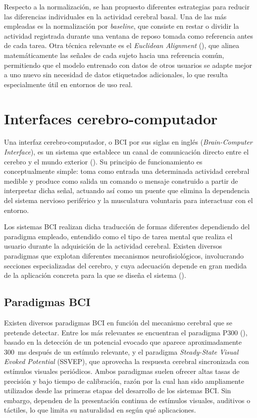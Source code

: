 Respecto a la normalización, se han propuesto diferentes estrategias para reducir las diferencias individuales en la actividad cerebral basal. Una de las más empleadas es la normalización por \textit{baseline}, que consiste en restar o dividir la actividad registrada durante una ventana de reposo tomada como referencia antes de cada tarea. Otra técnica relevante es el \textit{Euclidean Alignment} (\cite{he2019transfer}), que alinea matemáticamente las señales de cada sujeto hacia una referencia común, permitiendo que el modelo entrenado con datos de otros usuarios se adapte mejor a uno nuevo sin necesidad de datos etiquetados adicionales, lo que resulta especialmente útil en entornos de uso real.

\section{Interfaces cerebro-computador}
\label{sec:bci}
Una interfaz cerebro-computador, o BCI por sus siglas en inglés (\textit{Brain-Computer Interface}), es un sistema que establece un canal de comunicación directo entre el cerebro y el mundo exterior (\cite{wolpaw2002brain}). Su principio de funcionamiento es conceptualmente simple: toma como entrada una determinada actividad cerebral medible y produce como salida un comando o mensaje construido a partir de interpretar dicha señal, actuando así como un puente que elimina la dependencia del sistema nervioso periférico y la musculatura voluntaria para interactuar con el entorno.

Los sistemas BCI realizan dicha traducción de formas diferentes dependiendo del paradigma empleado, entendido como el tipo de tarea mental que realiza el usuario durante la adquisición de la actividad cerebral. Existen diversos paradigmas que explotan diferentes mecanismos neurofisiológicos, involucrando secciones especializadas del cerebro, y cuya adecuación depende en gran medida de la aplicación concreta para la que se diseña el sistema (\cite{nicolas2012brain}).

\subsection{Paradigmas BCI}
\label{subsec:paradigmasBCI}

Existen diversos paradigmas BCI en función del mecanismo cerebral que se pretende detectar. Entre los más relevantes se encuentran el paradigma P300 (\cite{farwell1988talking}), basado en la detección de un potencial evocado que aparece aproximadamente 300~ms después de un estímulo relevante, y el paradigma \textit{Steady-State Visual Evoked Potential} (SSVEP), que aprovecha la respuesta cerebral sincronizada con estímulos visuales periódicos. Ambos paradigmas suelen ofrecer altas tasas de precisión y bajo tiempo de calibración, razón por la cual han sido ampliamente utilizados desde las primeras etapas del desarrollo de los sistemas BCI. Sin embargo, dependen de la presentación continua de estímulos visuales, auditivos o táctiles, lo que limita su naturalidad en según qué aplicaciones.

